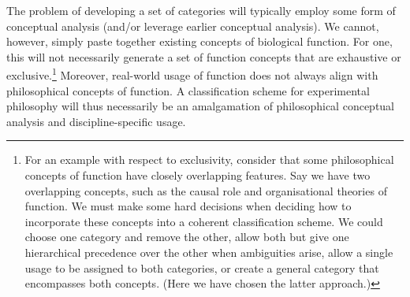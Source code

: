 \documentclass{article}
\begin{document}
The problem of developing a set of categories will typically employ some form of conceptual analysis (and/or leverage earlier conceptual analysis).
We cannot, however, simply paste together existing concepts of biological function.
For one, this will not necessarily generate a set of function concepts that are exhaustive or exclusive.\footnote{For an example with respect to exclusivity, consider that some philosophical concepts of function have closely overlapping features. Say we have two overlapping concepts, such as the causal role and organisational theories of function. We must make some hard decisions when deciding how to incorporate these concepts into a coherent classification scheme. We could choose one category and remove the other, allow both but give one hierarchical precedence over the other when ambiguities arise, allow a single usage to be assigned to both categories, or create a general category that encompasses both concepts. (Here we have chosen the latter approach.)}
Moreover, real-world usage of function does not always align with philosophical concepts of function.
A classification scheme for experimental philosophy will thus necessarily be an amalgamation of philosophical conceptual analysis and discipline-specific usage.
\end{document}

